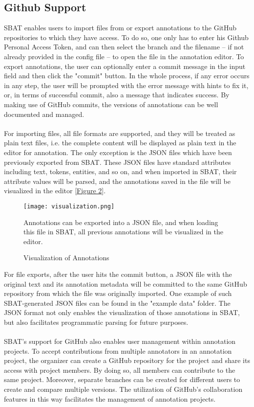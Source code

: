 \documentclass[12ptm a4paper]{article}
\begin{document}
\subsection{Github Support}
SBAT enables users to import files from or export annotations to the GitHub repositories to which they have access. To do so, one only has to enter his Github Personal Access Token, and can then select the branch and the filename -- if not already provided in the config file -- to open the file in the annotation editor. To export annotations, the user can optionally enter a commit message in the input field and then click the "commit" button. In the whole process, if any error occurs in any step, the user will be prompted with the error message with hints to fix it, or, in terms of successful commit, also a message that indicates success. By making use of GitHub commits, the versions of annotations can be well documented and managed.\\
\\
For importing files, all file formats are supported, and they will be treated as plain text files, i.e. the complete content will be displayed as plain text in the editor for annotation. The only exception is the JSON files which have been previously exported from SBAT. These JSON files have standard attributes including text, tokens, entities, and so on, and when imported in SBAT, their attribute values will be parsed, and the annotations saved in the file will be visualized in the editor [\hyperref[figure2]{Figure 2}].\\

\begin{figure}[H]
{\centering
\texttt{[image: visualization.png]}
\label{figure2}
\caption{Visualization of Annotations}
}
{\scriptsize Annotations can be exported into a JSON file, and when loading this file in SBAT, all previous annotations will be visualized in the editor.\par}
\end{figure}

For file exports, after the user hits the commit button, a JSON file with the original text and its annotation metadata will be committed to the same GitHub repository from which the file was originally imported. One example of such SBAT-generated JSON files can be found in the "example data" folder. The JSON format not only enables the visualization of those annotations in SBAT, but also facilitates programmatic parsing for future purposes.\\
\\
SBAT's support for GitHub also enables user management within annotation projects. To accept contributions from multiple annotators in an annotation project, the organizer can create a GitHub repository for the project and share its access with project members. By doing so, all members can contribute to the same project. Moreover, separate branches can be created for different users to create and compare multiple versions. The utilization of GitHub's collaboration features in this way facilitates the management of annotation projects.
\end{document}
